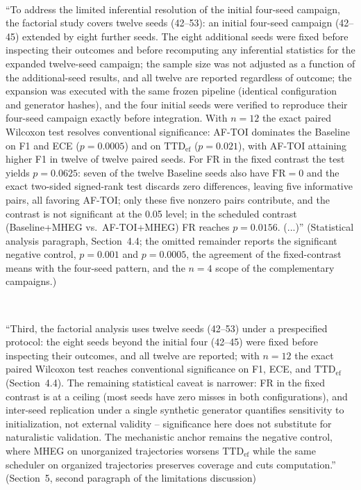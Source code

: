 \documentclass[1p,12pt,authoryear]{elsarticle}
\begin{document}
~

``To address the limited inferential resolution of the initial four-seed campaign, the factorial study covers twelve seeds (42--53): an initial four-seed campaign (42--45) extended by eight further seeds. The eight additional seeds were fixed before inspecting their outcomes and before recomputing any inferential statistics for the expanded twelve-seed campaign; the sample size was not adjusted as a function of the additional-seed results, and all twelve are reported regardless of outcome; the expansion was executed with the same frozen pipeline (identical configuration and generator hashes), and the four initial seeds were verified to reproduce their four-seed campaign exactly before integration. With $n=12$ the exact paired Wilcoxon test resolves conventional significance: AF-TOI dominates the Baseline on F1 and ECE ($p=0.0005$) and on $\mathrm{TTD}_{\mathrm{ef}}$ ($p=0.021$), with AF-TOI attaining higher F1 in twelve of twelve paired seeds. For FR in the fixed contrast the test yields $p=0.0625$: seven of the twelve Baseline seeds also have $\mathrm{FR}=0$ and the exact two-sided signed-rank test discards zero differences, leaving five informative pairs, all favoring AF-TOI; only these five nonzero pairs contribute, and the contrast is not significant at the 0.05 level; in the scheduled contrast (Baseline+MHEG vs.\ AF-TOI+MHEG) FR reaches $p=0.0156$. (...)'' (Statistical analysis paragraph, Section~4.4; the omitted remainder reports the significant negative control, $p=0.001$ and $p=0.0005$, the agreement of the fixed-contrast means with the four-seed pattern, and the $n{=}4$ scope of the complementary campaigns.)

~

``Third, the factorial analysis uses twelve seeds (42--53) under a prespecified protocol: the eight seeds beyond the initial four (42--45) were fixed before inspecting their outcomes, and all twelve are reported; with $n=12$ the exact paired Wilcoxon test reaches conventional significance on F1, ECE, and $\mathrm{TTD}_{\mathrm{ef}}$ (Section~4.4). The remaining statistical caveat is narrower: FR in the fixed contrast is at a ceiling (most seeds have zero misses in both configurations), and inter-seed replication under a single synthetic generator quantifies sensitivity to initialization, not external validity -- significance here does not substitute for naturalistic validation. The mechanistic anchor remains the negative control, where MHEG on unorganized trajectories worsens $\mathrm{TTD}_{\mathrm{ef}}$ while the same scheduler on organized trajectories preserves coverage and cuts computation.'' (Section~5, second paragraph of the limitations discussion)
\end{document}
